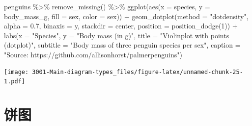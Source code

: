 \documentclass[
]{book}
\newenvironment{Shaded}{\begin{snugshade}}{\end{snugshade}}
\newcommand{\AttributeTok}[1]{\textcolor[rgb]{0.77,0.63,0.00}{#1}}
\newcommand{\DecValTok}[1]{\textcolor[rgb]{0.00,0.00,0.81}{#1}}
\newcommand{\FloatTok}[1]{\textcolor[rgb]{0.00,0.00,0.81}{#1}}
\newcommand{\FunctionTok}[1]{\textcolor[rgb]{0.00,0.00,0.00}{#1}}
\newcommand{\NormalTok}[1]{#1}
\newcommand{\SpecialCharTok}[1]{\textcolor[rgb]{0.00,0.00,0.00}{#1}}
\newcommand{\StringTok}[1]{\textcolor[rgb]{0.31,0.60,0.02}{#1}}
\begin{document}
\begin{Shaded}
\begin{Highlighting}[]
\NormalTok{penguins }\SpecialCharTok{\%\textgreater{}\%}
    \FunctionTok{remove\_missing}\NormalTok{() }\SpecialCharTok{\%\textgreater{}\%}
    \FunctionTok{ggplot}\NormalTok{(}\FunctionTok{aes}\NormalTok{(}\AttributeTok{x =}\NormalTok{ species, }\AttributeTok{y =}\NormalTok{ body\_mass\_g,}
               \AttributeTok{fill =}\NormalTok{ sex, }\AttributeTok{color =}\NormalTok{ sex)) }\SpecialCharTok{+}
    \FunctionTok{geom\_dotplot}\NormalTok{(}\AttributeTok{method =} \StringTok{"dotdensity"}\NormalTok{, }\AttributeTok{alpha =} \FloatTok{0.7}\NormalTok{,}
                 \AttributeTok{binaxis =} \StringTok{\textquotesingle{}y\textquotesingle{}}\NormalTok{, }\AttributeTok{stackdir =} \StringTok{\textquotesingle{}center\textquotesingle{}}\NormalTok{,}
                 \AttributeTok{position =} \FunctionTok{position\_dodge}\NormalTok{(}\DecValTok{1}\NormalTok{)) }\SpecialCharTok{+}
      \FunctionTok{labs}\NormalTok{(}\AttributeTok{x =} \StringTok{"Species"}\NormalTok{, }
           \AttributeTok{y =} \StringTok{"Body mass (in g)"}\NormalTok{,}
          \AttributeTok{title =} \StringTok{"Violinplot with points (dotplot)"}\NormalTok{, }
          \AttributeTok{subtitle =} \StringTok{"Body mass of three penguin species per sex"}\NormalTok{,}
          \AttributeTok{caption =} \StringTok{"Source: https://github.com/allisonhorst/palmerpenguins"}\NormalTok{)}
\end{Highlighting}
\end{Shaded}

\texttt{[image: 3001-Main-diagram-types\_files/figure-latex/unnamed-chunk-25-1.pdf]}

\hypertarget{ux997cux56fe-1}{%
\section{饼图}\label{ux997cux56fe-1}}
\end{document}
